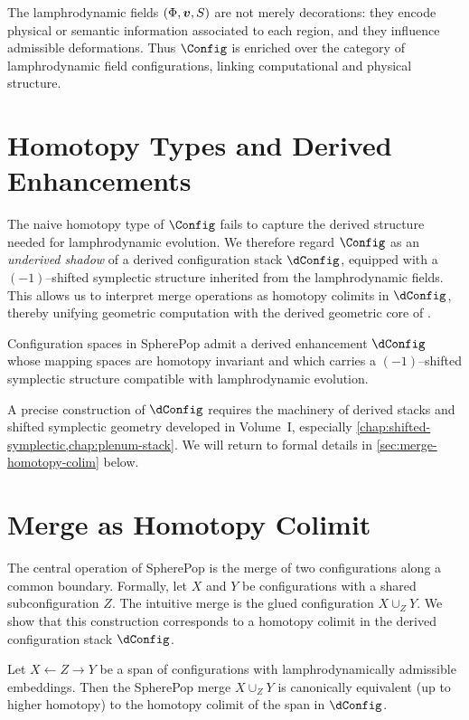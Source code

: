 \begin{remark}
The lamphrodynamic fields $(\Phi,\bm{v},S)$ are not merely
decorations: they encode physical or semantic information associated
to each region, and they influence admissible deformations. Thus
$\Config$ is enriched over the category of lamphrodynamic field
configurations, linking computational and physical structure.
\end{remark}

\section{Homotopy Types and Derived Enhancements}

The naive homotopy type of $\Config$ fails to capture the derived
structure needed for lamphrodynamic evolution. We therefore regard
$\Config$ as an \emph{underived shadow} of a derived configuration
stack $\dConfig$, equipped with a $( -1 )$--shifted symplectic
structure inherited from the lamphrodynamic fields. This allows us
to interpret merge operations as homotopy colimits in $\dConfig$,
thereby unifying geometric computation with the derived geometric
core of \rsvpabbr{}.

\begin{theorem}[informal]
Configuration spaces in SpherePop admit a derived enhancement
$\dConfig$ whose mapping spaces are homotopy invariant and which
carries a $( -1 )$--shifted symplectic structure compatible with
lamphrodynamic evolution.
\end{theorem}

A precise construction of $\dConfig$ requires the machinery of derived
stacks and shifted symplectic geometry developed in Volume~I,
especially \cref{chap:shifted-symplectic,chap:plenum-stack}. We will
return to formal details in \cref{sec:merge-homotopy-colim} below.

\section{Merge as Homotopy Colimit}

The central operation of SpherePop is the merge of two configurations
along a common boundary. Formally, let $X$ and $Y$ be configurations
with a shared subconfiguration $Z$. The intuitive merge is the
glued configuration $X \cup_Z Y$. We show that this construction
corresponds to a homotopy colimit in the derived configuration stack
$\dConfig$.

\begin{theorem}
\label{thm:merge-hocolim}
Let $X \leftarrow Z \rightarrow Y$ be a span of configurations with
lamphrodynamically admissible embeddings. Then the SpherePop merge
$X \cup_Z Y$ is canonically equivalent (up to higher homotopy) to the
homotopy colimit of the span in $\dConfig$.
\end{theorem}

